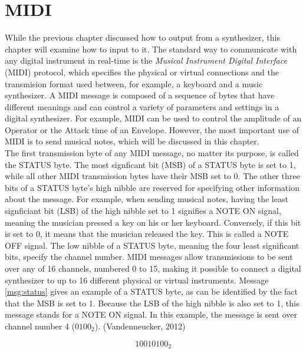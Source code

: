 \chapter{MIDI}

While the previous chapter discussed how to output from a synthesizer, this chapter will examine how to input to it. The standard way to communicate with any digital instrument in real-time is the \emph{Musical Instrument Digital Interface} (MIDI) protocol, which specifies the physical or virtual connections and the transmision format used between, for example, a keyboard and a music synthesizer. A MIDI message is composed of a sequence of bytes that have different meanings and can control a variety of parameters and settings in a digital synthesizer. For example, MIDI can be used to control the amplitude of an Operator or the Attack time of an Envelope. However, the most important use of MIDI is to send musical notes, which will be discussed in this chapter.\\

\noindent The first transmission byte of any MIDI message, no matter its purpose, is called the STATUS byte. The most signficant bit (MSB\footnotemark{}) of a STATUS byte is set to 1, while all other MIDI transmission bytes have their MSB set to 0. The other three bits of a STATUS byte's high nibble\footnotemark{} are reserved for specifying other information about the message. For example, when sending musical notes, having the least signficiant bit (LSB) of the high nibble set to 1 signifies a NOTE ON signal, meaning the musician pressed a key on his or her keyboard. Conversely, if this bit is set to 0, it means that the musician released the key. This is called a NOTE OFF signal. The low nibble of a STATUS byte, meaning the four least significant bits, specify the channel number. MIDI messages allow transmissions to be sent over any of 16 channels, numbered 0 to 15, making it possible to connect a digital synthesizer to up to 16 different physical or virtual instruments. Message \ref{msg:status} gives an example of a STATUS byte, as can be identified by the fact that the MSB is set to 1. Because the LSB of the high nibble is also set to 1, this message stands for a NOTE ON signal. In this example, the message is sent over channel number 4 (${0100}_{2}$). (Vandenneucker, 2012)

\begin{equation}
  {10010100}_{2}
  \label{msg:status}
\end{equation}

